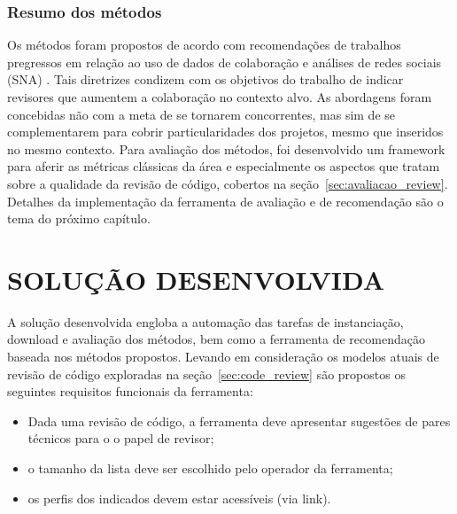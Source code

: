 \documentclass[12pt,openany,oneside,a4paper,english,brazil]{abntbibufjf}
\begin{document}
\subsection{Resumo dos métodos}
Os métodos foram propostos de acordo com recomendações de trabalhos pregressos em relação ao uso de dados de colaboração e análises de redes sociais (SNA) \cite{fu2017, xia2017, schettino2019b}. Tais diretrizes condizem com os objetivos do trabalho de indicar revisores que aumentem a colaboração no contexto alvo. As abordagens foram concebidas não com a meta de se tornarem concorrentes, mas sim de se complementarem para cobrir particularidades dos projetos, mesmo que inseridos no mesmo contexto. Para avaliação dos métodos, foi desenvolvido um framework para aferir as métricas clássicas da área e especialmente os aspectos que tratam sobre a qualidade da revisão de código, cobertos na seção~\ref{sec:avaliacao_review}. Detalhes da implementação da ferramenta de avaliação e de recomendação são o tema do próximo capítulo.


\chapter{SOLUÇÃO DESENVOLVIDA}\label{chap:solucao}
    A solução desenvolvida engloba a automação das tarefas de instanciação, download e avaliação dos métodos, bem como a ferramenta de recomendação baseada nos métodos propostos. Levando em consideração os modelos atuais de revisão de código exploradas na seção~\ref{sec:code_review} são propostos os seguintes requisitos funcionais da ferramenta:
		\begin{itemize}
			\item Dada uma revisão de código, a ferramenta deve apresentar sugestões de pares técnicos para o o papel de revisor;
			\item o tamanho da lista deve ser escolhido pelo operador da ferramenta;
			\item os perfis dos indicados devem estar acessíveis (via link).
		\end{itemize}
\end{document}
